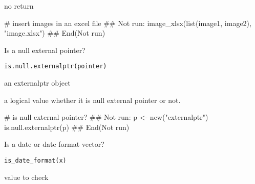 \documentclass[letterpaper]{book}
\begin{document}
%
\begin{Value}
no return
\end{Value}
%
\begin{Examples}
\begin{ExampleCode}
# insert images in an excel file
## Not run: 
image_xlsx(list(image1, image2), "image.xlsx")
## End(Not run)

\end{ExampleCode}
\end{Examples}
%
\begin{Description}
Is a null external pointer?
\end{Description}
%
\begin{Usage}
\begin{verbatim}
is.null.externalptr(pointer)
\end{verbatim}
\end{Usage}
%
\begin{Arguments}
\begin{ldescription}
\item[\code{pointer}] an externalptr object
\end{ldescription}
\end{Arguments}
%
\begin{Value}
a logical value whether it is null external pointer or not.
\end{Value}
%
\begin{Examples}
\begin{ExampleCode}
# is null external pointer?
## Not run: 
p <- new("externalptr")
is.null.externalptr(p)
## End(Not run)

\end{ExampleCode}
\end{Examples}
%
\begin{Description}
Is a date or date format vector?
\end{Description}
%
\begin{Usage}
\begin{verbatim}
is_date_format(x)
\end{verbatim}
\end{Usage}
%
\begin{Arguments}
\begin{ldescription}
\item[\code{x}] value to check
\end{ldescription}
\end{Arguments}
\end{document}
